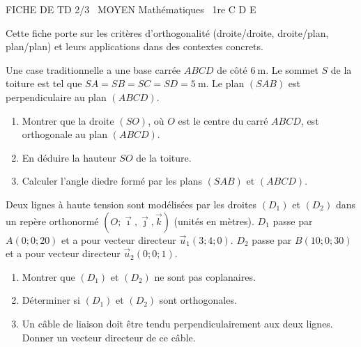 \documentclass[11pt]{article}
\begin{document}
\begin{tcolorbox}[enhanced,colback=popink,colframe=popink,arc=10pt,boxrule=0pt,left=12pt,right=12pt,top=9pt,bottom=9pt]
{\color{white}\popxbold\small FICHE DE TD 2/3 \textbullet\ MOYEN \hfill Mathématiques \textbullet\ 1re C D E\par}
\end{tcolorbox}
\vspace{4pt}
Cette fiche porte sur les critères d'orthogonalité (droite/droite, droite/plan, plan/plan) et leurs applications dans des contextes concrets.

\begin{exercice}
Une case traditionnelle a une base carrée $ABCD$ de côté $\SI{6}{\meter}$. Le sommet $S$ de la toiture est tel que $SA = SB = SC = SD = \SI{5}{\meter}$. Le plan $(SAB)$ est perpendiculaire au plan $(ABCD)$.
\begin{enumerate}
    \item Montrer que la droite $(SO)$, où $O$ est le centre du carré $ABCD$, est orthogonale au plan $(ABCD)$.
    \item En déduire la hauteur $SO$ de la toiture.
    \item Calculer l'angle diedre formé par les plans $(SAB)$ et $(ABCD)$.
\end{enumerate}
\end{exercice}

\begin{exercice}
Deux lignes à haute tension sont modélisées par les droites $(D_1)$ et $(D_2)$ dans un repère orthonormé $(O; \vec{\imath}, \vec{\jmath}, \vec{k})$ (unités en mètres).
$D_1$ passe par $A(0; 0; 20)$ et a pour vecteur directeur $\vec{u}_1(3; 4; 0)$.
$D_2$ passe par $B(10; 0; 30)$ et a pour vecteur directeur $\vec{u}_2(0; 0; 1)$.
\begin{enumerate}
    \item Montrer que $(D_1)$ et $(D_2)$ ne sont pas coplanaires.
    \item Déterminer si $(D_1)$ et $(D_2)$ sont orthogonales.
    \item Un câble de liaison doit être tendu perpendiculairement aux deux lignes. Donner un vecteur directeur de ce câble.
\end{enumerate}
\end{exercice}
\end{document}
